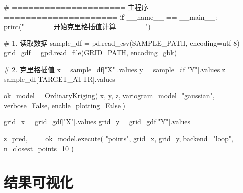 \documentclass[
  letterpaper,
  DIV=11,
  numbers=noendperiod]{scrreprt}
\newenvironment{Shaded}{\begin{snugshade}}{\end{snugshade}}
\newcommand{\BuiltInTok}[1]{\textcolor[rgb]{0.00,0.23,0.31}{#1}}
\newcommand{\CommentTok}[1]{\textcolor[rgb]{0.37,0.37,0.37}{#1}}
\newcommand{\ControlFlowTok}[1]{\textcolor[rgb]{0.00,0.23,0.31}{\textbf{#1}}}
\newcommand{\DecValTok}[1]{\textcolor[rgb]{0.68,0.00,0.00}{#1}}
\newcommand{\NormalTok}[1]{\textcolor[rgb]{0.00,0.23,0.31}{#1}}
\newcommand{\OperatorTok}[1]{\textcolor[rgb]{0.37,0.37,0.37}{#1}}
\newcommand{\StringTok}[1]{\textcolor[rgb]{0.13,0.47,0.30}{#1}}
\newcommand{\VariableTok}[1]{\textcolor[rgb]{0.07,0.07,0.07}{#1}}
\begin{document}
\begin{Shaded}
\begin{Highlighting}[]
\CommentTok{\# ===================== 主程序 =====================}
\ControlFlowTok{if} \VariableTok{\_\_name\_\_} \OperatorTok{==} \StringTok{\textquotesingle{}\_\_main\_\_\textquotesingle{}}\NormalTok{:}
    \BuiltInTok{print}\NormalTok{(}\StringTok{"===== 开始克里格插值计算 ====="}\NormalTok{)}
    
    \CommentTok{\# 1. 读取数据}
\NormalTok{    sample\_df }\OperatorTok{=}\NormalTok{ pd.read\_csv(SAMPLE\_PATH, encoding}\OperatorTok{=}\StringTok{\textquotesingle{}utf{-}8\textquotesingle{}}\NormalTok{)}
\NormalTok{    grid\_gdf }\OperatorTok{=}\NormalTok{ gpd.read\_file(GRID\_PATH, encoding}\OperatorTok{=}\StringTok{\textquotesingle{}gbk\textquotesingle{}}\NormalTok{)}

    \CommentTok{\# 2. 克里格插值}
\NormalTok{    x }\OperatorTok{=}\NormalTok{ sample\_df[}\StringTok{"X"}\NormalTok{].values}
\NormalTok{    y }\OperatorTok{=}\NormalTok{ sample\_df[}\StringTok{"Y"}\NormalTok{].values}
\NormalTok{    z }\OperatorTok{=}\NormalTok{ sample\_df[TARGET\_ATTR].values}

\NormalTok{    ok\_model }\OperatorTok{=}\NormalTok{ OrdinaryKriging(}
\NormalTok{        x, y, z,}
\NormalTok{        variogram\_model}\OperatorTok{=}\StringTok{"gaussian"}\NormalTok{,}
\NormalTok{        verbose}\OperatorTok{=}\VariableTok{False}\NormalTok{,}
\NormalTok{        enable\_plotting}\OperatorTok{=}\VariableTok{False}
\NormalTok{    )}

\NormalTok{    grid\_x }\OperatorTok{=}\NormalTok{ grid\_gdf[}\StringTok{"X"}\NormalTok{].values}
\NormalTok{    grid\_y }\OperatorTok{=}\NormalTok{ grid\_gdf[}\StringTok{"Y"}\NormalTok{].values}

\NormalTok{    z\_pred, \_ }\OperatorTok{=}\NormalTok{ ok\_model.execute(}
        \StringTok{"points"}\NormalTok{, grid\_x, grid\_y,}
\NormalTok{        backend}\OperatorTok{=}\StringTok{"loop"}\NormalTok{,}
\NormalTok{        n\_closest\_points}\OperatorTok{=}\DecValTok{10}
\NormalTok{    )}
\end{Highlighting}
\end{Shaded}


\chapter{结果可视化}\label{ux7ed3ux679cux53efux89c6ux5316}
\end{document}

